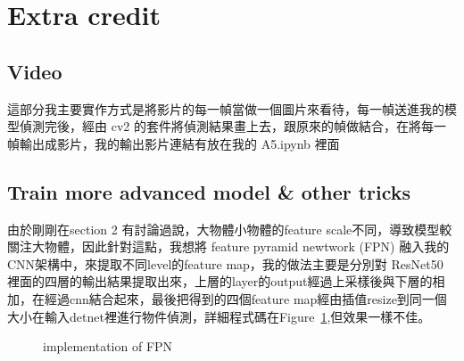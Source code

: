 \documentclass[a4paper,12pt]{article}   %
\begin{document}
\section{Extra credit}

\subsection{Video}
	這部分我主要實作方式是將影片的每一幀當做一個圖片來看待，每一幀送進我的模型偵測完後，經由 cv2 的套件將偵測結果畫上去，跟原來的幀做結合，在將每一幀輸出成影片，我的輸出影片連結有放在我的 A5.ipynb 裡面


\subsection{Train more advanced model \& other tricks} 
	由於剛剛在section 2 有討論過說，大物體小物體的feature scale不同，導致模型較關注大物體，因此針對這點，我想將 feature pyramid newtwork (FPN) 融入我的CNN架構中，來提取不同level的feature map，我的做法主要是分別對 ResNet50 裡面的四層的輸出結果提取出來，上層的layer的output經過上采樣後與下層的相加，在經過cnn結合起來，最後把得到的四個feature map經由插值resize到同一個大小在輸入detnet裡進行物件偵測，詳細程式碼在Figure\ \ref{fig:code2},但效果一樣不佳。

\begin{figure}[htb]
  \vspace{0.1\baselineskip}  
  \centering  
    \caption{implementation of FPN}
    \label{fig:code2}
  \vspace{0.1\baselineskip}
\end{figure}
\end{document}
